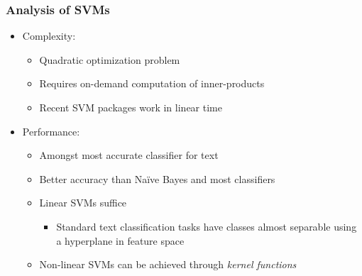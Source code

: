 \documentclass{beamer}
\begin{document}

\begin{frame} \frametitle{Analysis of SVMs}
  
  \begin{itemize}
  \item Complexity:
    \begin{itemize}
    \item Quadratic optimization problem
    \item Requires on-demand computation of inner-products
    \item Recent SVM packages work in linear time
    \end{itemize}
  \item Performance:
    \begin{itemize}
    \item Amongst most accurate classifier for text
    \item Better accuracy than Na{\"i}ve Bayes and most classifiers
    \item Linear SVMs suffice
      \begin{itemize}
      \item Standard text classification tasks have classes almost separable
        using a hyperplane in feature space
      \end{itemize}
    \item Non-linear SVMs can be achieved through \emph{kernel functions}
    \end{itemize}
  \end{itemize}

\end{frame}





\end{document}
